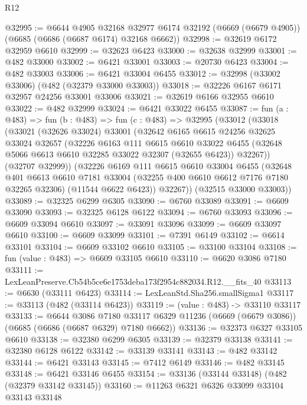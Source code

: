 \begin{lexlean}{R12}
\begin{coremodule}
@32995 := @6644
    @4905
    @32168
    @32977
    @6174
    @32192
    (@6669 (@6679 @4905))
    (@6685 (@6686 (@6687 @6174) @32168 @6662))
@32998 := @32619 @6172 @32959 @6610
@32999 := @32623 @6423
@33000 := @32638 @32999
@33001 := @482 @33000
@33002 := @6421 @33001
@33003 := @20730 @6423
@33004 := @482 @33003
@33006 := @6421 @33004 @6455
@33012 := @32998 (@33002 @33006) (@482 (@32379 @33000 @33003))
@33018 := @32226 @6167 @6171 @32957 @24256 @33001 @33006
@33021 := @32619 @6166 @32955 @6610
@33022 := @482 @32999
@33024 := @6421 @33022 @6455
@33087 := fun (a : @483) =>
  fun (b : @483) =>
  fun (c : @483) =>
  @32995
    (@33012
      (@33018
        (@33021
          (@32626 @33024)
          @33001
          (@32642
            @6165
            @6615
            @24256
            @32625
            @33024
            @32657
            (@32226
              @6163
              @111
              @6615
              @6610
              @33022
              @6455
              (@32648 @5066 @6613 @6610 @32285 @33022 @32307 (@32655 @6423))
              @32267))
          (@32707 @32999))
        (@32226
          @6169
          @111
          @6615
          @6610
          @33004
          @6455
          (@32648
            @401
            @6613
            @6610
            @7181
            @33004
            (@32255 @400 @6610 @6612 @7176 @7180 @32265 @32306)
            (@11544 @6622 @6423))
          @32267))
      (@32515 @33000 @33003))
@33089 := @32325 @6299 @6305
@33090 := @6760 @33089
@33091 := @6609 @33090
@33093 := @32325 @6128 @6122
@33094 := @6760 @33093
@33096 := @6609 @33094 @6610
@33097 := @33091 @33096
@33099 := @6609 @33097 @6610
@33100 := @6609 @33099
@33101 := @7391 @6149
@33102 := @6614 @33101
@33104 := @6609 @33102 @6610
@33105 := @33100 @33104
@33108 := fun (value : @483) => @6609 @33105 @6610
@33110 := @6620 @3086 @7180
@33111 := LexLeanPreserve.Cb54b5ce6e1753deba173f2954c882034.R12.__fits_40
@33113 := @6630 (@33111 @6423)
@33114 := LexLeanStd.Sha256.smallSigma1
@33117 := @33113 (@482 (@33114 @6423))
@33119 := (value : @483) -> @33110 @33117
@33133 := @6644
    @3086
    @7180
    @33117
    @6329
    @11236
    (@6669 (@6679 @3086))
    (@6685 (@6686 (@6687 @6329) @7180 @6662))
@33136 := @32373 @6327 @33105 @6610
@33138 := @32380 @6299 @6305
@33139 := @32379 @33138
@33141 := @32380 @6128 @6122
@33142 := @33139 @33141
@33143 := @482 @33142
@33144 := @6421 @33143
@33145 := @7412 @6149
@33146 := @482 @33145
@33148 := @6421 @33146 @6455
@33154 := @33136 (@33144 @33148) (@482 (@32379 @33142 @33145))
@33160 := @11263 @6321 @6326 @33099 @33104 @33143 @33148

\end{coremodule}
\end{lexlean}
